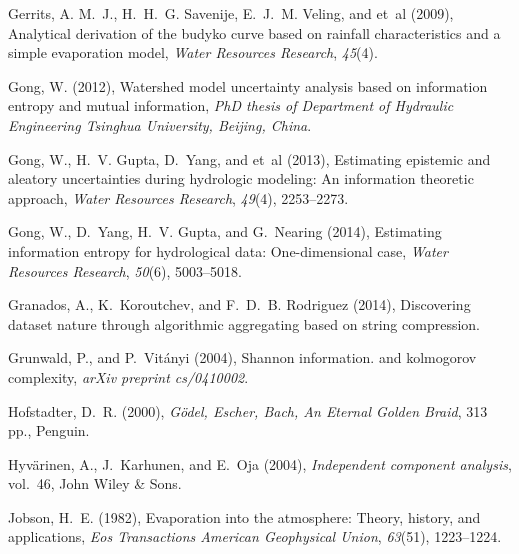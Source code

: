 \documentclass[draft,wrr]{AGUTeX}
\begin{document}
\begin{article}
\begin{thebibliography}{59}
Gerrits, A. M.~J., H.~H.~G. Savenije, E.~J.~M. Veling, and et~al (2009),
  Analytical derivation of the budyko curve based on rainfall characteristics
  and a simple evaporation model, \textit{Water Resources Research},
  \textit{45}(4).

Gong, W. (2012), Watershed model uncertainty analysis based on information
  entropy and mutual information, \textit{PhD thesis of Department of Hydraulic
  Engineering Tsinghua University, Beijing, China}.

Gong, W., H.~V. Gupta, D.~Yang, and et~al (2013), Estimating epistemic and
  aleatory uncertainties during hydrologic modeling: An information theoretic
  approach, \textit{Water Resources Research}, \textit{49}(4), 2253--2273.

Gong, W., D.~Yang, H.~V. Gupta, and G.~Nearing (2014), Estimating information
  entropy for hydrological data: One-dimensional case, \textit{Water Resources
  Research}, \textit{50}(6), 5003--5018.

Granados, A., K.~Koroutchev, and F.~D.~B. Rodriguez (2014), Discovering dataset
  nature through algorithmic aggregating based on string compression.

Grunwald, P., and P.~Vit{\'a}nyi (2004), Shannon information. and kolmogorov
  complexity, \textit{arXiv preprint cs/0410002}.

Hofstadter, D.~R. (2000), \textit{G{\"o}del, Escher, Bach, An Eternal Golden
  Braid}, 313 pp., Penguin.

Hyv{\"a}rinen, A., J.~Karhunen, and E.~Oja (2004), \textit{Independent
  component analysis}, vol.~46, John Wiley \& Sons.

Jobson, H.~E. (1982), Evaporation into the atmosphere: Theory, history, and
  applications, \textit{Eos Transactions American Geophysical Union},
  \textit{63}(51), 1223--1224.


\end{thebibliography}
\end{article}
\end{document}
